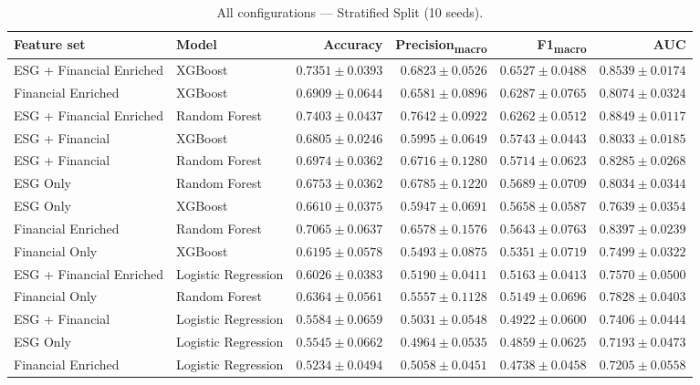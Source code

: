 \begin{table}[htbp]
  \centering
  \caption{All configurations — Stratified Split (10 seeds).}
  \label{tab:full_stratified}
  \small
  \begin{tabular}{llrrrr}
    \toprule
    Feature set & Model & Accuracy & Precision\textsubscript{macro} & F1\textsubscript{macro} & AUC \\
    \midrule
    ESG + Financial Enriched & XGBoost & $0.7351 \pm 0.0393$ & $0.6823 \pm 0.0526$ & $0.6527 \pm 0.0488$ & $0.8539 \pm 0.0174$ \\
    Financial Enriched & XGBoost & $0.6909 \pm 0.0644$ & $0.6581 \pm 0.0896$ & $0.6287 \pm 0.0765$ & $0.8074 \pm 0.0324$ \\
    ESG + Financial Enriched & Random Forest & $0.7403 \pm 0.0437$ & $0.7642 \pm 0.0922$ & $0.6262 \pm 0.0512$ & $0.8849 \pm 0.0117$ \\
    ESG + Financial & XGBoost & $0.6805 \pm 0.0246$ & $0.5995 \pm 0.0649$ & $0.5743 \pm 0.0443$ & $0.8033 \pm 0.0185$ \\
    ESG + Financial & Random Forest & $0.6974 \pm 0.0362$ & $0.6716 \pm 0.1280$ & $0.5714 \pm 0.0623$ & $0.8285 \pm 0.0268$ \\
    ESG Only & Random Forest & $0.6753 \pm 0.0362$ & $0.6785 \pm 0.1220$ & $0.5689 \pm 0.0709$ & $0.8034 \pm 0.0344$ \\
    ESG Only & XGBoost & $0.6610 \pm 0.0375$ & $0.5947 \pm 0.0691$ & $0.5658 \pm 0.0587$ & $0.7639 \pm 0.0354$ \\
    Financial Enriched & Random Forest & $0.7065 \pm 0.0637$ & $0.6578 \pm 0.1576$ & $0.5643 \pm 0.0763$ & $0.8397 \pm 0.0239$ \\
    Financial Only & XGBoost & $0.6195 \pm 0.0578$ & $0.5493 \pm 0.0875$ & $0.5351 \pm 0.0719$ & $0.7499 \pm 0.0322$ \\
    ESG + Financial Enriched & Logistic Regression & $0.6026 \pm 0.0383$ & $0.5190 \pm 0.0411$ & $0.5163 \pm 0.0413$ & $0.7570 \pm 0.0500$ \\
    Financial Only & Random Forest & $0.6364 \pm 0.0561$ & $0.5557 \pm 0.1128$ & $0.5149 \pm 0.0696$ & $0.7828 \pm 0.0403$ \\
    ESG + Financial & Logistic Regression & $0.5584 \pm 0.0659$ & $0.5031 \pm 0.0548$ & $0.4922 \pm 0.0600$ & $0.7406 \pm 0.0444$ \\
    ESG Only & Logistic Regression & $0.5545 \pm 0.0662$ & $0.4964 \pm 0.0535$ & $0.4859 \pm 0.0625$ & $0.7193 \pm 0.0473$ \\
    Financial Enriched & Logistic Regression & $0.5234 \pm 0.0494$ & $0.5058 \pm 0.0451$ & $0.4738 \pm 0.0458$ & $0.7205 \pm 0.0558$ \\

\end{tabular}
\end{table}

